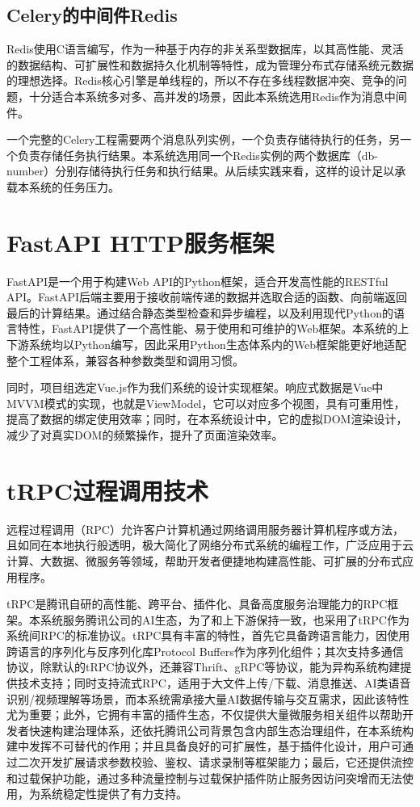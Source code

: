 \subsection{Celery的中间件Redis}

Redis使用C语言编写，作为一种基于内存的非关系型数据库，以其高性能、灵活的数据结构、可扩展性和数据持久化机制等特性，成为管理分布式存储系统元数据的理想选择\cite{16, yin2025}。Redis核心引擎是单线程的，所以不存在多线程数据冲突、竞争的问题，十分适合本系统多对多、高并发的场景，因此本系统选用Redis作为消息中间件。

一个完整的Celery工程需要两个消息队列实例，一个负责存储待执行的任务，另一个负责存储任务执行结果。本系统选用同一个Redis实例的两个数据库（db-number）分别存储待执行任务和执行结果。从后续实践来看，这样的设计足以承载本系统的任务压力。

\section{FastAPI HTTP服务框架}

FastAPI是一个用于构建Web API的Python框架，适合开发高性能的RESTful API。FastAPI后端主要用于接收前端传递的数据并选取合适的函数、向前端返回最后的计算结果\cite{15}。通过结合静态类型检查和异步编程，以及利用现代Python的语言特性，FastAPI提供了一个高性能、易于使用和可维护的Web框架。本系统的上下游系统均以Python编写，因此采用Python生态体系内的Web框架能更好地适配整个工程体系，兼容各种参数类型和调用习惯。

同时，项目组选定Vue.js作为我们系统的设计实现框架。响应式数据是Vue中MVVM模式的实现，也就是ViewModel，它可以对应多个视图，具有可重用性，提高了数据的绑定使用效率；同时，在本系统设计中，它的虚拟DOM渲染设计，减少了对真实DOM的频繁操作，提升了页面渲染效率\cite{20}。

\section{tRPC过程调用技术}

远程过程调用（RPC）允许客户计算机通过网络调用服务器计算机程序或方法，且如同在本地执行般透明，极大简化了网络分布式系统的编程工作，广泛应用于云计算、大数据、微服务等领域，帮助开发者便捷地构建高性能、可扩展的分布式应用程序\cite{2}。

tRPC是腾讯自研的高性能、跨平台、插件化、具备高度服务治理能力的RPC框架。本系统服务腾讯公司的AI生态，为了和上下游保持一致，也采用了tRPC作为系统间RPC的标准协议。tRPC具有丰富的特性，首先它具备跨语言能力，因使用跨语言的序列化与反序列化库Protocol Buffers作为序列化组件；其次支持多通信协议，除默认的tRPC协议外，还兼容Thrift、gRPC等协议，能为异构系统构建提供技术支持；同时支持流式RPC，适用于大文件上传/下载、消息推送、AI类语音识别/视频理解等场景，而本系统需承接大量AI数据传输与交互需求，因此该特性尤为重要；此外，它拥有丰富的插件生态，不仅提供大量微服务相关组件以帮助开发者快速构建治理体系，还依托腾讯公司背景包含内部生态治理组件，在本系统构建中发挥不可替代的作用；并且具备良好的可扩展性，基于插件化设计，用户可通过二次开发扩展请求参数校验、鉴权、请求录制等框架能力；最后，它还提供流控和过载保护功能，通过多种流量控制与过载保护插件防止服务因访问突增而无法使用，为系统稳定性提供了有力支持。

